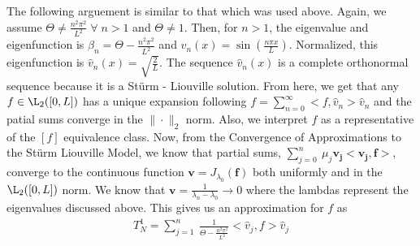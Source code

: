 \documentclass[11pt]{SelfArxOneColBMN}
\begin{document}
\begin{itemize}
  \begin{solution}
    The following arguement is similar to that which was used above. Again, we assume $\Theta \neq \frac{n^2\pi^2}{L^2} \; \forall \; n > 1$ and $\Theta \neq 1$. Then, for $n > 1$, the eigenvalue and eigenfunction is $\beta_n = \Theta - \frac{n^2\pi^2}{L^2}$ and $v_n(x) = \sin(\frac{n\pi x}{L})$. Normalized, this eigenfunction is $\hat{v}_n(x) = \sqrt{\frac{2}{L}}$. The sequence $\hat{v}_n(x)$ is a complete orthonormal sequence because it is a St\"urm - Liouville solution. From here, we get that any $f \in \L_2([0,L])$ has a unique expansion following $f = \sum_{n=0}^\infty<f,\hat{v}_n>\hat{v}_n$ and the patial sums converge in the $\|\cdot\|_2$ norm. Also, we interpret $f$ as a representative of the $[f]$ equivalence class. Now, from the Convergence of Approximations to the St\"urm Liouville Model, we know that partial sums, $\sum_{j=0}^n\:\mu_j\mathbf{v_j}<\mathbf{v_j},\mathbf{f}>$, converge to the continuous function $\mathbf{v} = J_{\lambda_0}(\mathbf{f})$ both uniformly and in the $\L_2([0,L])$ norm. We know that $\mathbf{v} = \frac{1}{\lambda_n - \lambda_0} \rightarrow 0$ where the lambdas represent the eigenvalues discussed above. This gives us
    an approximation for $f$ as
    \begin{eqnarray*}
    T_N^1 = \sum_{j=1}^n\:\frac{1}{\Theta - \frac{n^2\pi^2}{L^2}}<\hat{v}_j,f>\hat{v}_j
  \end{eqnarray*}
  \end{solution}
\end{itemize}
\end{document}
